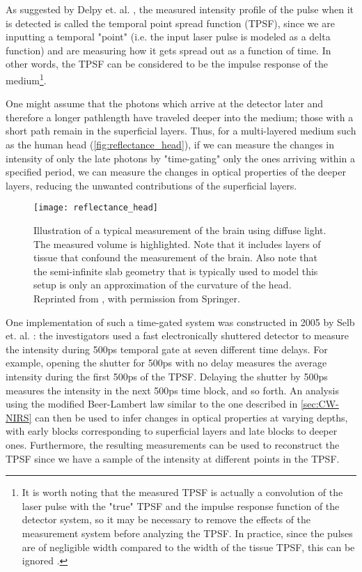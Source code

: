 As suggested by Delpy et. al. \cite{Delpy1988}, the measured intensity profile of the pulse when it is detected is called the temporal point spread function (TPSF), since we are inputting a temporal "point" (i.e. the input laser pulse is modeled as a delta function) and are measuring how it gets spread out as a function of time. In other words, the TPSF can be considered to be the impulse response of the medium\footnote{It is worth noting that the measured TPSF is actually a convolution of the laser pulse with the "true" TPSF and the impulse response function of the detector system, so it may be necessary to remove the effects of the measurement system before analyzing the TPSF. In practice, since the pulses are of negligible width compared to the width of the tissue TPSF, this can be ignored \cite[ch. 20.4.1]{Handbook}.}.

One might assume that the photons which arrive at the detector later and therefore a longer pathlength have traveled deeper into the medium; those with a short path remain in the superficial layers. Thus, for a multi-layered medium such as the human head (\autoref{fig:reflectance_head}), if we can measure the changes in intensity of only the late photons by "time-gating" only the ones arriving within a specified period, we can measure the changes in optical properties of the deeper layers, reducing the unwanted contributions of the superficial layers. 

\begin{figure}[tb]
    \centering
    \texttt{[image: reflectance\_head]}
    \caption{Illustration of a typical measurement of the brain using diffuse light. The measured volume is highlighted. Note that it includes layers of tissue that confound the measurement of the brain. Also note that the semi-infinite slab geometry that is typically used to model this setup is only an approximation of the curvature of the head. Reprinted from \cite[ch. 3]{Madsen2013}, with permission from Springer.} %
    \label{fig:reflectance_head}
\end{figure}

One implementation of such a time-gated system was constructed in 2005 by Selb et. al. \cite{Selb2005}: the investigators used a fast electronically shuttered detector to measure the intensity during 500ps temporal gate at seven different time delays. For example, opening the shutter for 500ps with no delay measures the average intensity during the first 500ps of the TPSF. Delaying the shutter by 500ps measures the intensity in the next 500ps time block, and so forth. An analysis using the modified Beer-Lambert law similar to the one described in \autoref{sec:CW-NIRS} can then be used to infer changes in optical properties at varying depths, with early blocks corresponding to superficial layers and late blocks to deeper ones. Furthermore, the resulting measurements can be used to reconstruct the TPSF since we have a sample of the intensity at different points in the TPSF.

